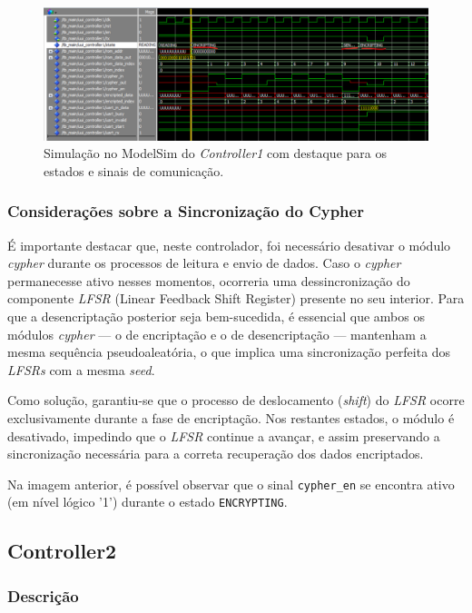 \documentclass[12pt, a4paper]{article}
\begin{document}
\begin{figure}[h]
    \centering
    \includegraphics[width=0.95\linewidth]{images/controller1_simulation.png}
    \caption{Simulação no ModelSim do \textit{Controller1} com destaque para os estados e sinais de comunicação.}
    \label{fig:simulacao_controller1}
\end{figure}

\subsubsection{Considerações sobre a Sincronização do Cypher}
É importante destacar que, neste controlador, foi necessário desativar o módulo \textit{cypher} durante os processos de leitura e envio de dados.  
Caso o \textit{cypher} permanecesse ativo nesses momentos, ocorreria uma dessincronização do componente \textit{LFSR} (Linear Feedback Shift Register) presente no seu interior.  
Para que a desencriptação posterior seja bem-sucedida, é essencial que ambos os módulos \textit{cypher} — o de encriptação e o de desencriptação — mantenham a mesma sequência pseudoaleatória, o que implica uma sincronização perfeita dos \textit{LFSRs} com a mesma \textit{seed}.  

Como solução, garantiu-se que o processo de deslocamento (\textit{shift}) do \textit{LFSR} ocorre exclusivamente durante a fase de encriptação.  
Nos restantes estados, o módulo é desativado, impedindo que o \textit{LFSR} continue a avançar, e assim preservando a sincronização necessária para a correta recuperação dos dados encriptados.

Na imagem anterior, é possível observar que o sinal \texttt{cypher\_en} se encontra ativo (em nível lógico '1') durante o estado \texttt{ENCRYPTING}.

\newpage

\subsection{Controller2}
\subsubsection{Descrição}
\end{document}
